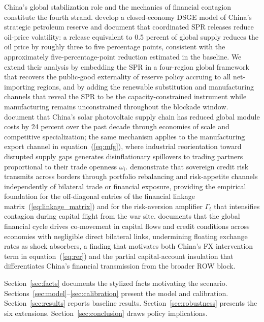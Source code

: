 \documentclass[12pt]{article}
\begin{document}
China's global stabilization role and the mechanics of financial contagion constitute the fourth strand. \citet{zhang2020china} develop a closed-economy DSGE model of China's strategic petroleum reserve and document that coordinated SPR releases reduce oil-price volatility: a release equivalent to 0.5 percent of global supply reduces the oil price by roughly three to five percentage points, consistent with the approximately five-percentage-point reduction estimated in the baseline. We extend their analysis by embedding the SPR in a four-region global framework that recovers the public-good externality of reserve policy accruing to all net-importing regions, and by adding the renewable substitution and manufacturing channels that reveal the SPR to be the capacity-constrained instrument while manufacturing remains unconstrained throughout the blockade window. \citet{helveston2019china} document that China's solar photovoltaic supply chain has reduced global module costs by 24 percent over the past decade through economies of scale and competitive specialization; the same mechanism applies to the manufacturing export channel in equation~(\ref{eq:mfg}), where industrial reorientation toward disrupted supply gaps generates disinflationary spillovers to trading partners proportional to their trade openness $\omega_i$. \citet{longstaff2011financial} demonstrate that sovereign credit risk transmits across borders through portfolio rebalancing and risk-appetite channels independently of bilateral trade or financial exposure, providing the empirical foundation for the off-diagonal entries of the financial linkage matrix~(\ref{eq:linkage_matrix}) and for the risk-aversion amplifier $\Gamma_t$ that intensifies contagion during capital flight from the war site. \citet{rey2015dilemma} documents that the global financial cycle drives co-movement in capital flows and credit conditions across economies with negligible direct bilateral links, undermining floating exchange rates as shock absorbers, a finding that motivates both China's FX intervention term in equation~(\ref{eq:rer}) and the partial capital-account insulation that differentiates China's financial transmission from the broader ROW block.

Section~\ref{sec:facts} documents the stylized facts motivating the scenario. Sections~\ref{sec:model}--\ref{sec:calibration} present the model and calibration. Section~\ref{sec:results} reports baseline results. Section~\ref{sec:robustness} presents the six extensions. Section~\ref{sec:conclusion} draws policy implications.
\end{document}
